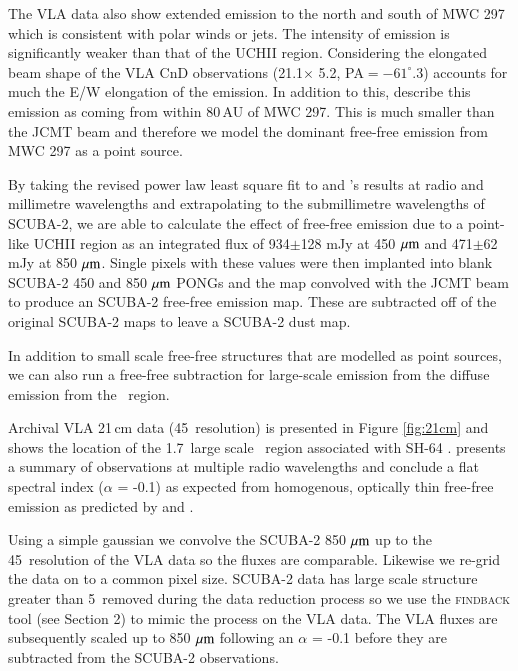 The VLA data also show extended emission to the north and south of MWC 297 which is consistent with polar 
winds or jets. The intensity of emission is significantly weaker than that of the UCH\textrm{II} region. Considering 
the elongated beam shape of the VLA CnD observations (21.1\arcsec $\times$ 5.2\arcsec, PA$ = -61^{\circ}.3$) 
accounts for much the E/W elongation of the emission. In addition to this, \cite{Manoj:2007ly} describe this emission 
as coming from within 80\,AU of MWC 297. This is much smaller than the JCMT beam and therefore we model the 
dominant free-free emission from MWC 297 as a point source.

By taking the revised power law least square fit to \cite{Skinner:1993bh} and \cite{Sandell:2011dz}'s results at radio and millimetre wavelengths and extrapolating to the submillimetre wavelengths of SCUBA-2, we are able to calculate the effect of free-free emission due to a point-like UCH\textrm{II} region as an integrated flux of 934$\pm$128 mJy at 450\,$\,\mu\rm{m}$ and 471$\pm$62 mJy at 850\,$\,\mu\rm{m}$. 
Single pixels with these values were then implanted into blank SCUBA-2 450 and 850\,$\,\mu\rm{m}$ PONGs and the map convolved with the JCMT beam to produce an SCUBA-2 free-free emission map. These are subtracted off of the original SCUBA-2 maps to leave a SCUBA-2 dust map.

In addition to small scale free-free structures that are modelled as point sources, we can also run a free-free subtraction for large-scale emission from the diffuse emission from the \HII\ region.

Archival VLA 21\,cm data (45\arcsec\ resolution) is presented in Figure \ref{fig:21cm} and shows the location of the 1.7\arcmin\ large scale \HII\ region associated with SH-64 \citep{Condon:1998kx}. \cite{Rodney:2008ij} presents a summary of observations at multiple radio wavelengths and conclude a flat spectral index ($\alpha$ = -0.1) as expected from homogenous, optically thin free-free emission as predicted by \cite{Oster:1961fk} and \cite{Mezger:1967fk}.  

Using a simple gaussian we convolve the SCUBA-2 850\,$\,\mu\rm{m}$ up to the 45\arcsec\ resolution of the VLA data so the fluxes are comparable. Likewise we re-grid the data on to a common pixel size. SCUBA-2 data has large scale structure greater than 5\arcmin\ removed during the data reduction process so we use the \textsc{findback} tool (see Section 2) to mimic the process on the VLA data. The VLA fluxes are subsequently scaled up to 850\,$\,\mu\rm{m}$ following an $\alpha$ = -0.1 before they are subtracted from the SCUBA-2 observations. 

